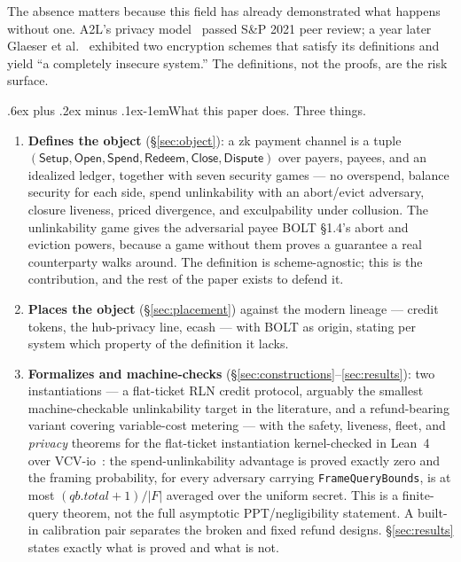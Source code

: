 \documentclass[9pt]{extarticle}
\makeatletter
\renewcommand\paragraph{\@startsection{paragraph}{4}{0pt}%
  {.6ex plus .2ex minus .1ex}{-1em}{\normalfont\normalsize\bfseries}}
\newcommand{\decl}[1]{\nolinkurl{#1}}
\makeatother
\begin{document}
The absence matters because this field has already demonstrated what
happens without one. A2L's privacy model~\cite{a2l2021} passed S\&P 2021
peer review; a year later Glaeser et al.~\cite{glaeser2022bcs} exhibited
two encryption schemes that satisfy its definitions and yield ``a
completely insecure system.'' The definitions, not the proofs, are the
risk surface.

\paragraph{What this paper does.} Three things.
\begin{enumerate}
\item \textbf{Defines the object} (\S\ref{sec:object}): a zk payment
channel is a tuple $(\mathsf{Setup}, \mathsf{Open}, \mathsf{Spend},
\mathsf{Redeem}, \mathsf{Close}, \mathsf{Dispute})$ over payers, payees,
and an idealized ledger, together with seven security games --- no
overspend, balance security for each side, spend unlinkability with an
abort/evict adversary, closure liveness, priced divergence, and
exculpability under collusion. The unlinkability game gives the
adversarial payee BOLT \S1.4's abort and eviction powers, because a game
without them proves a guarantee a real counterparty walks around. The
definition is scheme-agnostic; this is the contribution, and the rest of
the paper exists to defend it.
\item \textbf{Places the object} (\S\ref{sec:placement}) against the
modern lineage --- credit tokens, the hub-privacy line, ecash --- with
BOLT as origin, stating per system which property of the definition it
lacks.
\item \textbf{Formalizes and machine-checks} (\S\ref{sec:constructions}--\ref{sec:results}):
two instantiations --- a flat-ticket RLN credit protocol, arguably the
smallest machine-checkable unlinkability target in the literature, and a
refund-bearing variant covering variable-cost metering --- with the
safety, liveness, fleet, and \emph{privacy} theorems for the flat-ticket
instantiation kernel-checked in Lean~4 over VCV-io~\cite{vcvio2026}: the
spend-unlinkability advantage is proved exactly zero and the framing
probability, for every adversary carrying \decl{FrameQueryBounds}, is at
most $(qb.total+1)/|F|$ averaged over the uniform secret. This is a
finite-query theorem, not the full asymptotic PPT/negligibility statement.
A built-in calibration pair separates the broken and fixed refund designs.
\S\ref{sec:results} states exactly what is proved and what is not.
\end{enumerate}
\end{document}
